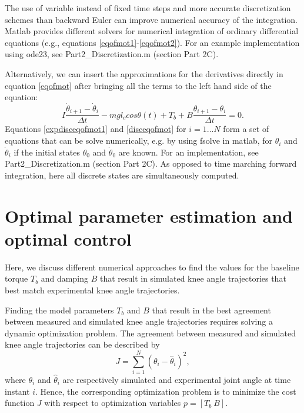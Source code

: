 \documentclass[
a4paper, %
11pt, %
onecolumn, %
openright, %
]{memoir}
\begin{document}
The use of variable instead of fixed time steps and more accurate discretization schemes than backward Euler can improve numerical accuracy of the integration. Matlab provides different solvers for numerical integration of ordinary differential equations (e.g., equations \ref{eqofmot1}-\ref{eqofmot2}). For an example implementation using ode23, see Part2\_Discretization.m (section Part 2C).

Alternatively, we can insert the approximations for the derivatives directly in equation \ref{eqofmot} after bringing all the terms to the left hand side of the equation:
\begin{equation}
I \frac{\dot\theta_{i+1} - \dot\theta_{i}}{\Delta t} - m g l_c cos\theta(t) + T_b + B \frac{\theta_{i+1} - \theta_{i}}{\Delta t} = 0.
\label{disceqofmot}
\end{equation}
Equations \ref{expdisceqofmot1} and \ref{disceqofmot} for $i = 1 \ldots N$ form a set of equations that can be solve numerically, e.g. by using fsolve in matlab, for $\theta_i$ and $\dot{\theta}_i$ if the initial states $\theta_0$ and $\dot{\theta}_0$ are known.  
For an implementation, see Part2\_Discretization.m (section Part 2C).
As opposed to time marching forward integration, here all discrete states are simultaneously computed. %




\chapter{Optimal parameter estimation and optimal control}

Here, we discuss different numerical approaches to find the values for the baseline torque $T_b$ and damping $B$ that result in simulated knee angle trajectories that best match experimental knee angle trajectories. 

Finding the model parameters $T_b$ and $B$ that result in the best agreement between measured and simulated knee angle trajectories requires solving a dynamic optimization problem. The agreement between measured and simulated knee angle trajectories can be described by
\begin{equation}
J = \sum_{i = 1}^{N} ( \theta_i - \hat{\theta}_i )^2,
\end{equation}
where $\theta_i$ and $\hat{\theta}_i$ are respectively simulated and experimental joint angle at time instant $i$. Hence, the corresponding optimization problem is to minimize the cost function $J$ with respect to optimization variables $ p = [T_b \: B]$. 
\end{document}
